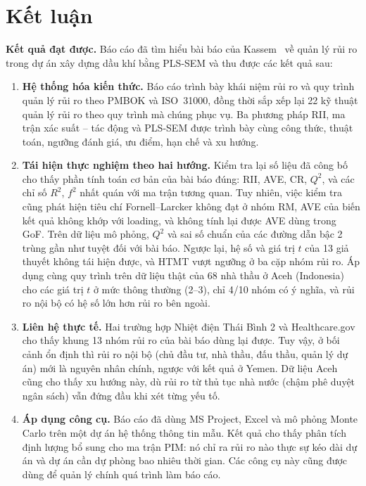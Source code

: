 \chapter*{Kết luận}

\textbf{Kết quả đạt được.} Báo cáo đã tìm hiểu bài báo của Kassem~\cite{kassem2022} về quản lý rủi ro trong dự án xây dựng dầu khí bằng PLS-SEM và thu được các kết quả sau:
\begin{enumerate}
  \item \textbf{Hệ thống hóa kiến thức.} Báo cáo trình bày khái niệm rủi ro và quy trình quản lý rủi ro theo PMBOK và ISO~31000, đồng thời sắp xếp lại 22 kỹ thuật quản lý rủi ro theo quy trình mà chúng phục vụ. Ba phương pháp RII, ma trận xác suất -- tác động và PLS-SEM được trình bày cùng công thức, thuật toán, ngưỡng đánh giá, ưu điểm, hạn chế và xu hướng.
  \item \textbf{Tái hiện thực nghiệm theo hai hướng.} Kiểm tra lại số liệu đã công bố cho thấy phần tính toán cơ bản của bài báo đúng: RII, AVE, CR, $Q^2$, và các chỉ số $R^2$, $f^2$ nhất quán với ma trận tương quan. Tuy nhiên, việc kiểm tra cũng phát hiện tiêu chí Fornell--Larcker không đạt ở nhóm RM, AVE của biến kết quả không khớp với loading, và không tính lại được AVE dùng trong GoF. Trên dữ liệu mô phỏng, $Q^2$ và sai số chuẩn của các đường dẫn bậc 2 trùng gần như tuyệt đối với bài báo. Ngược lại, hệ số và giá trị $t$ của 13 giả thuyết không tái hiện được, và HTMT vượt ngưỡng ở ba cặp nhóm rủi ro. Áp dụng cùng quy trình trên dữ liệu thật của 68 nhà thầu ở Aceh (Indonesia) cho các giá trị $t$ ở mức thông thường (2--3), chỉ 4/10 nhóm có ý nghĩa, và rủi ro nội bộ có hệ số lớn hơn rủi ro bên ngoài.
  \item \textbf{Liên hệ thực tế.} Hai trường hợp Nhiệt điện Thái Bình 2 và Healthcare.gov cho thấy khung 13 nhóm rủi ro của bài báo dùng lại được. Tuy vậy, ở bối cảnh ổn định thì rủi ro nội bộ (chủ đầu tư, nhà thầu, đấu thầu, quản lý dự án) mới là nguyên nhân chính, ngược với kết quả ở Yemen. Dữ liệu Aceh cũng cho thấy xu hướng này, dù rủi ro từ thủ tục nhà nước (chậm phê duyệt ngân sách) vẫn đứng đầu khi xét từng yếu tố.
  \item \textbf{Áp dụng công cụ.} Báo cáo đã dùng MS Project, Excel và mô phỏng Monte Carlo trên một dự án hệ thống thông tin mẫu. Kết quả cho thấy phân tích định lượng bổ sung cho ma trận PIM: nó chỉ ra rủi ro nào thực sự kéo dài dự án và dự án cần dự phòng bao nhiêu thời gian. Các công cụ này cũng được dùng để quản lý chính quá trình làm báo cáo.
\end{enumerate}

